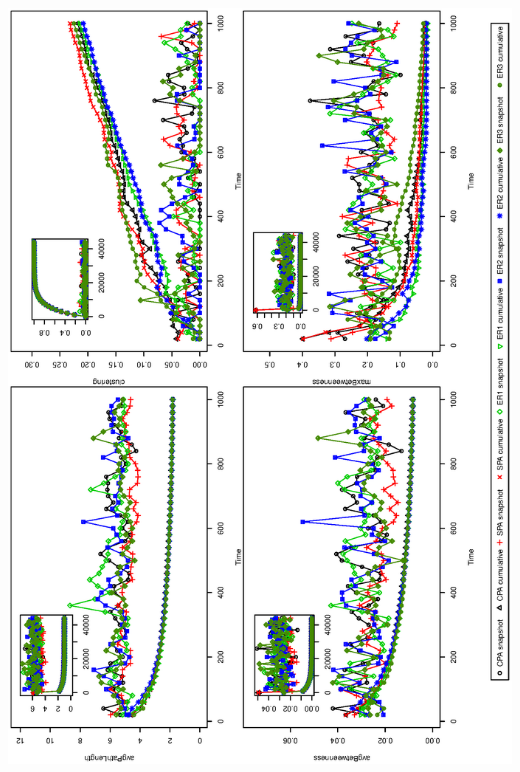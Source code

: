 \documentclass[a0paper,portrait]{baposter}
\begin{document}
\begin{poster}
{\includegraphics[angle=-90,width=0.98\linewidth]{PA_and_ER_Models_statisticalMeasures}
}


\end{poster}
\end{document}
